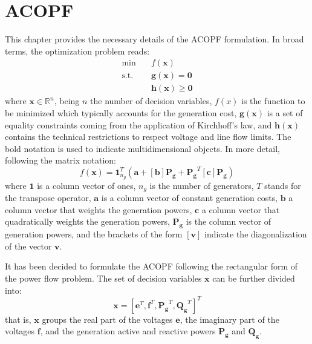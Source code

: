 \documentclass{article}
\begin{document}
\section{ACOPF}
This chapter provides the necessary details of the ACOPF formulation. In broad terms, the optimization problem reads: 
\begin{equation}
\begin{split}
    \text{min} \quad & f(\bm{x}) \\
    \text{s.t.} \quad & \bm{g}(\bm{x}) = \bm{0} \\
     & \bm{h}(\bm{x}) \geq \bm{0}
\end{split}
\end{equation}
where $\bm{x} \in \mathbb{R}^n$, being $n$ the number of decision variables, $f(x)$ is the function to be minimized which typically accounts for the generation cost, $\bm{g}(\bm{x})$ is a set of equality constraints coming from the application of Kirchhoff's law, and $\bm{h}(\bm{x})$ contains the technical restrictions to respect voltage and line flow limits. The bold notation is used to indicate multidimensional objects. In more detail, following the matrix notation:
\begin{equation}
    f(\bm{x}) = \bm{1}^T_{n_g} (\bm{a} + [\bm{b}]\bm{P_g} + \bm{P_g}^T [\bm{c}] \bm{P_g})
\end{equation}
where $\bm{1}$ is a column vector of ones, $n_g$ is the number of generators, $T$ stands for the transpose operator, $\bm{a}$ is a column vector of constant generation costs, $\bm{b}$ a column vector that weights the generation powers, $\bm{c}$ a column vector that quadratically weights the generation powers, $\bm{P_g}$ is the column vector of generation powers, and the brackets of the form $[\bm{v}]$ indicate the diagonalization of the vector $\bm{v}$. 

It has been decided to formulate the ACOPF following the rectangular form of the power flow problem. The set of decision variables $\bm{x}$ can be further divided into:
\begin{equation}
    \bm{x} = [\bm{e}^T, \bm{f}^T, \bm{P_g}^T, \bm{Q_g}^T]^T
\end{equation}
that is, $\bm{x}$ groups the real part of the voltages $\bm{e}$, the imaginary part of the voltages $\bm{f}$, and the generation active and reactive powers $\bm{P_g}$ and $\bm{Q_g}$. 
\end{document}
